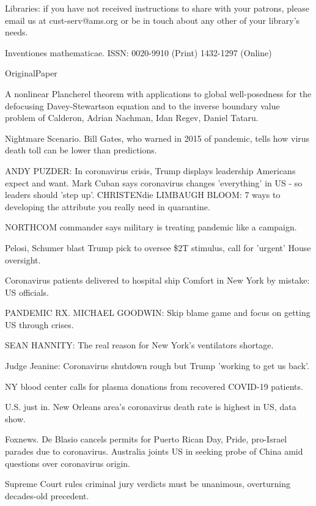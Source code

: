 Libraries: if you have not received
instructions to share with your patrons,
please email us at cust-serv@ams.org
or be in touch about any other of your
library's needs.

\fi

Inventiones mathematicae.
ISSN: 0020-9910 (Print) 1432-1297 (Online)

OriginalPaper

A nonlinear Plancherel theorem with
applications to global well-posedness
for the defocusing Davey-Stewartson
equation and to the inverse
boundary value problem of Calderon,
Adrian Nachman, Idan Regev, Daniel
Tataru.

\fi

Nightmare Scenario.
Bill Gates, who warned in 2015 of
pandemic, tells how virus death toll
can be lower than predictions.

ANDY PUZDER: In coronavirus crisis,
Trump displays leadership Americans
expect and want.
Mark Cuban says coronavirus changes
'everything' in US - so leaders should
'step up'.
CHRISTENdie LIMBAUGH BLOOM: 7 ways to
developing the attribute you really
need in quarantine.

NORTHCOM commander says military is
treating pandemic like a campaign.

Pelosi, Schumer blast Trump pick to
oversee \$2T stimulus, call for
'urgent' House oversight.

Coronavirus patients delivered to
hospital ship Comfort in New York by
mistake: US officials.

PANDEMIC RX.
MICHAEL GOODWIN: Skip
blame game and focus on getting US through
crises.

SEAN HANNITY: The real reason
for New York's ventilators shortage.

Judge Jeanine: Coronavirus shutdown
rough but Trump 'working to get us back'.

NY blood center calls for plasma
donations from recovered
COVID-19 patients.

U.S. just in.
New Orleans area's coronavirus death rate
is highest in US, data show.

\smallskip{}

\fi

Foxnews.
De Blasio cancels permits for Puerto
Rican Day, Pride, pro-Israel parades due
to coronavirus.
Australia joints US in seeking
probe of China amid questions over
coronavirus origin.

Supreme Court rules criminal jury verdicts
must be unanimous, overturning
decades-old precedent.

